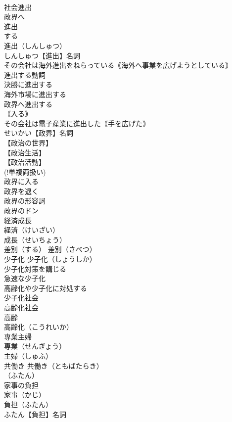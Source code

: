 \documentclass[8pt]{extreport}
\begin{document}
\begin{CJK}{UTF8}{min}
\\	社会進出
\\	政界へ
\\	進出
\\	する
\\	進出（しんしゅつ）
\\	しんしゅつ【進出】名詞
\\	その会社は海外進出をねらっている｟海外へ事業を広げようとしている｠
\\	進出する動詞
\\	決勝に進出する
\\	海外市場に進出する
\\	政界へ進出する
\\	｟入る｠
\\	その会社は電子産業に進出した｟手を広げた｠
\\	せいかい【政界】名詞
\\	【政治の世界】
\\	【政治生活】
\\	【政治活動】
\\	(!単複両扱い) 
\\	政界に入る
\\	政界を退く
\\	政界の形容詞
\\	政界のドン
\\	経済成長		
\\	経済（けいざい）
\\	成長（せいちょう）
\\	差別（する）		差別（さべつ）
\\	少子化		少子化（しょうしか）
\\	少子化対策を講じる
\\	急速な少子化
\\	高齢化や少子化に対処する
\\	少子化社会
\\	高齢化社会		
\\	高齢 
\\	高齢化（こうれいか）
\\	専業主婦		
\\	専業（せんぎょう）
\\	主婦（しゅふ）
\\	共働き		共働き（ともばたらき）
\\	（ふたん）
\\	家事の負担		
\\	家事（かじ）
\\	負担（ふたん）
\\	ふたん【負担】名詞

\end{CJK}
\end{document}
